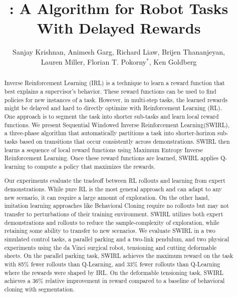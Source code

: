 \documentclass[Afour,sageh,times]{sagej}
\title{\LARGE \bf \hirl: A \hirlfull Algorithm for Robot Tasks With Delayed Rewards}
\author{%
Sanjay Krishnan, 
Animesh Garg, 
Richard Liaw,
Brijen Thananjeyan,\\
Lauren Miller,
Florian T. Pokorny$^{*}$,
Ken Goldberg%
}
\affiliation{\affilnum{1}AUTOLAB UC Berkeley\\
\affilnum{2}KTH Sweden}
\newcommand{\hirl}{SWIRL\xspace}
\newcommand{\hirlfull}{Sequential Windowed Inverse Reinforcement Learning\xspace}
\begin{document}
\begin{abstract}
Inverse Reinforcement Learning (IRL) is a technique to learn a reward function that best explains a supervisor's behavior.
These reward functions can be used to find policies for new instances of a task.
However, in multi-step tasks, the learned rewards might be delayed and hard to directly optimize with Reinforcement Learning (RL).
One approach is to segment the task into shorter sub-tasks and learn local reward functions.
We present \hirlfull (\hirl), a three-phase algorithm that automatically partitions a task into shorter-horizon sub-tasks based on transitions that occur consistently across demonstrations.
\hirl then learns a sequence of local reward functions using Maximum Entropy Inverse Reinforcement Learning. 
Once these reward functions are learned, \hirl applies Q-learning to compute a policy that maximizes the rewards. 

Our experiments evaluate the tradeoff between RL rollouts and learning from expert demonstrations.
While pure RL is the most general approach and can adapt to any new scenario, it can require a large amount of exploration. On the other hand, imitation learning approaches like Behavioral Cloning require no rollouts but may not transfer to perturbations of their training environment.
\hirl utilizes both expert demonstrations and rollouts to reduce the sample-complexity of exploration, while retaining some ability to transfer to new scenarios.
We evaluate \hirl in a two simulated control tasks, a parallel parking and a two-link pendulum, and two physical experiments using the da Vinci surgical robot, tensioning and cutting deformable sheets.
On the parallel parking task, SWIRL achieves the maximum reward on the task with 85\% fewer rollouts than Q-Learning, and 33\% fewer rollouts than Q-Learning where the rewards were shaped by IRL. 
On the deformable tensioning task, \hirl achieves a 36\%  relative  improvement in reward compared to a baseline of behavioral cloning with segmentation.
\end{abstract} 

\maketitle











\end{document}
